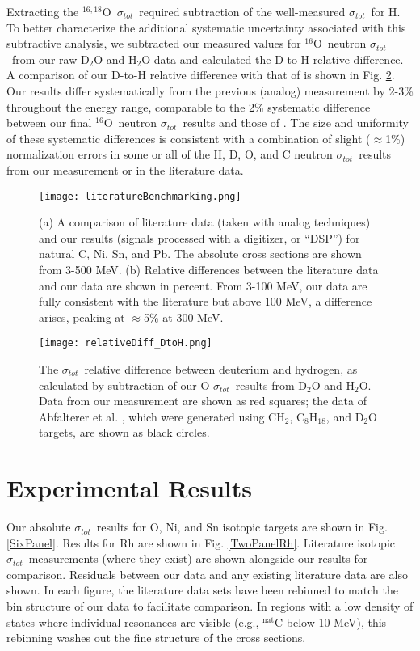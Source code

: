 \documentclass[twocolumn,secnumarabic,amssymb, nobibnotes, aps, prl,
superscriptaddress, nobalancelastpage, floatfix]{revtex4}
\newcommand{\tot}{\ensuremath{\sigma_{tot}}}
\newcommand{\oSix}{\ensuremath{^{16}}O}
\newcommand{\oSixEight}{\ensuremath{^{16,18}}O}
\begin{document}
Extracting the \oSixEight\ \tot\ required subtraction of the
well-measured \tot\ for H. To better characterize
the additional systematic uncertainty
associated with this subtractive analysis, we subtracted our measured
values for \oSix\ neutron \tot\ from our raw D$_{2}$O and H$_{2}$O data and 
calculated the D-to-H relative difference. A
comparison of our D-to-H relative difference with that of
\cite{Abfalterer1998} is shown in Fig. \ref{DtoH}.
Our results differ systematically from the previous (analog) measurement by 2-3\% throughout the
energy range, comparable to the 2\% systematic difference between our final
\oSix\ neutron \tot\ results and those of \cite{Abfalterer2001}. The size and
uniformity of these systematic differences is consistent with
a combination of slight ($\approx$1\%) normalization errors
in some or all of the H, D, O, and C neutron \tot\ results
from our measurement or in the literature data.
\begin{figure}[tb]
    \texttt{[image: literatureBenchmarking.png]}
    \caption{(a) A comparison of literature data (taken with analog
    techniques) and our results (signals processed with a digitizer, or ``DSP'')
    for natural C, Ni, Sn, and Pb. The absolute cross sections are shown from
    3-500 MeV. (b) Relative differences between the literature data and
    our data are shown in percent. From 3-100 MeV, our data are fully consistent with the
    literature but above 100 MeV, a difference arises, peaking at
    $\approx$5\% at 300 MeV.}
    \label{LiteratureBenchmarking}
\end{figure}
\begin{figure}[tb]
    \centering
    \texttt{[image: relativeDiff\_DtoH.png]}
    \caption[\tot\ relative difference between deuterium and hydrogen from our measurement]
    {The \tot\ relative difference between deuterium and hydrogen,
        as calculated by subtraction of our O \tot\ results from
        D$_{2}$O and H$_{2}$O. Data from our measurement are shown as red
        squares; the data of Abfalterer et al. \cite{Abfalterer1998}, which were generated using
        CH$_{2}$, C$_{8}$H$_{18}$, and D$_{2}$O targets, are shown as black circles.}
    \label{DtoH}
\end{figure}

\section{Experimental Results}
Our absolute \tot\ results for O, Ni, and Sn isotopic targets are shown in Fig.
\ref{SixPanel}. Results for Rh are shown in Fig. \ref{TwoPanelRh}.
Literature isotopic \tot\ measurements
(where they exist) are shown alongside our results for comparison.
Residuals between our data and any existing literature data are also shown.
In each figure, the literature data sets have been rebinned to match the bin
structure of our data to facilitate comparison. In regions with a low density of
states where individual resonances are visible (e.g., $^{\text{nat}}$C
below 10 MeV), this rebinning washes out the fine structure of the
cross sections.
\end{document}
